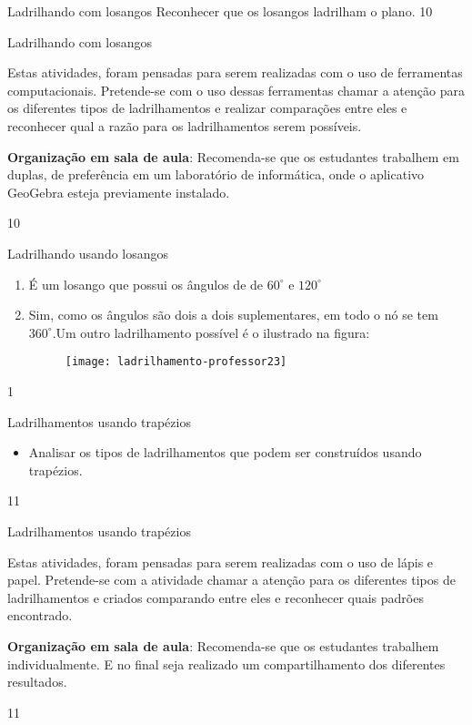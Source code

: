 \def\currentcolor{session2}
\begin{objectives}{Ladrilhando com losangos}
{
	Reconhecer que os losangos  ladrilham o plano.	
}{1}{0}
\end{objectives}
\begin{sugestions}{Ladrilhando com losangos}
{
	Estas atividades, foram pensadas para serem realizadas com o uso de ferramentas computacionais. Pretende-se com o uso dessas ferramentas chamar a atenção para os diferentes tipos de ladrilhamentos e realizar comparações entre eles e reconhecer qual a razão para os ladrilhamentos serem possíveis. 

	\textbf{Organização em sala de aula}: Recomenda-se que os estudantes trabalhem em duplas, de preferência em um laboratório de informática, onde o aplicativo GeoGebra esteja previamente instalado.
}{1}{0}
\end{sugestions}
\begin{answer}{Ladrilhando usando losangos}
{
	\begin{enumerate}
	\item É um losango que possui os ângulos de de $60^{\circ}$ e $120^{\circ}$
	\item Sim, como os ângulos são dois a dois suplementares, em todo o nó se tem $360^{\circ}$.Um outro ladrilhamento possível é o ilustrado na figura:
	\begin{figure}[H]
	\centering
	
	\texttt{[image: ladrilhamento-professor23]}
	\end{figure}
	\end{enumerate}
}{1}
\end{answer}
\clearmargin
\begin{objectives}{Ladrilhamentos usando trapézios}
{
	\begin{itemize}
	\item Analisar os tipos de ladrilhamentos que podem ser construídos usando trapézios.
	\end{itemize}
}{1}{1}
\end{objectives}
\begin{sugestions}{Ladrilhamentos usando trapézios}
{
	Estas atividades, foram pensadas para serem realizadas com o uso de lápis e papel. Pretende-se com a atividade chamar a atenção para os diferentes tipos de ladrilhamentos e criados comparando entre eles e reconhecer quais padrões encontrado. 

	\textbf{Organização em sala de aula}: Recomenda-se que os estudantes trabalhem individualmente. E no final seja realizado um compartilhamento dos diferentes resultados.
}{1}{1}
\end{sugestions}
